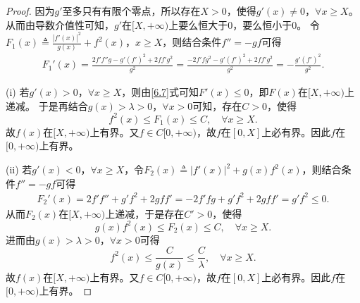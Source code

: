 \documentclass[../../main.tex]{subfiles}
\begin{document}
\begin{proof}
因为\(g'\)至多只有有限个零点，所以存在\(X>0\)，使得\(g'( x ) \ne 0\)，\(\forall x\geqslant X\)。从而由导数介值性可知，\(g'\)在\([ X,+\infty )\)上要么恒大于\(0\)，要么恒小于\(0\)。
令\(F_1( x ) \triangleq \frac{| f'( x ) |^2}{g( x )}+f^2( x )\)，\(x\geqslant X\)，则结合条件\(f'' =-gf\)可得
\begin{align}
F_{1}'( x ) =\frac{2f'f'' g-g'( f' )^2+2ff' g^2}{g^2}=\frac{-2f'fg^2-g'( f' )^2+2ff'g^2}{g^2}=-\frac{g'( f' )^2}{g^2}. \label{6.7}
\end{align}

(i) 若\(g'( x ) >0\)，\(\forall x\geqslant X\)，则由\eqref{6.7}式可知\(F'( x ) \leqslant 0\)，即\(F( x )\)在\([ X,+\infty )\)上递减。
于是再结合\(g( x ) >\lambda >0\)，\(\forall x>0\)可知，存在\(C>0\)，使得
\[
f^2( x ) \leqslant F_1( x ) \leqslant C,\quad\forall x\geqslant X.
\]
故\(f( x )\)在\([ X,+\infty )\)上有界。又\(f\in C[ 0,+\infty )\)，故\(f\)在\([ 0,X ]\)上必有界。因此\(f\)在\([ 0,+\infty )\)上有界。

(ii) 若\(g'( x ) <0\)，\(\forall x\geqslant X\)，令\(F_2( x ) \triangleq | f'( x ) |^2+g( x ) f^2( x )\)，则结合条件\(f'' =-gf\)可得
\begin{align}
F_{2}'( x ) =2f'f'' +g'f^2+2gff' =-2f'fg+g'f^2+2gff' =g'f^2\leqslant 0. \label{6.8}
\end{align}
从而\(F_2( x )\)在\([ X,+\infty )\)上递减，于是存在\(C'>0\)，使得
\[
g( x ) f^2( x ) \leqslant F_2( x ) \leqslant C,\quad\forall x\geqslant X.
\]
进而由\(g( x ) >\lambda >0\)，\(\forall x>0\)可得
\[
f^2( x ) \leqslant \frac{C}{g( x )}\leqslant \frac{C}{\lambda},\quad\forall x\geqslant X.
\]
故\(f( x )\)在\([ X,+\infty )\)上有界。又\(f\in C[ 0,+\infty )\)，故\(f\)在\([ 0,X ]\)上必有界。因此\(f\)在\([ 0,+\infty )\)上有界。

\end{proof}
\end{document}
